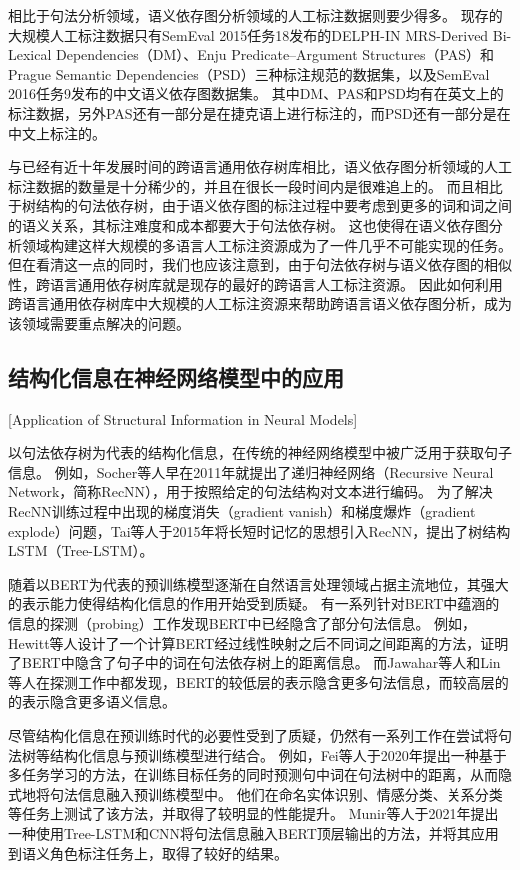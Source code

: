 相比于句法分析领域，语义依存图分析领域的人工标注数据则要少得多。
现存的大规模人工标注数据只有SemEval 2015任务18\cite{oepen-etal-2015-semeval}发布的DELPH-IN MRS-Derived Bi-Lexical Dependencies（DM）、Enju Predicate–Argument Structures（PAS）和Prague Semantic Dependencies（PSD）三种标注规范的数据集，以及SemEval 2016任务9\cite{che-etal-2016-semeval}发布的中文语义依存图数据集。
其中DM、PAS和PSD均有在英文上的标注数据，另外PAS还有一部分是在捷克语上进行标注的，而PSD还有一部分是在中文上标注的。

与已经有近十年发展时间的跨语言通用依存树库相比，语义依存图分析领域的人工标注数据的数量是十分稀少的，并且在很长一段时间内是很难追上的。
而且相比于树结构的句法依存树，由于语义依存图的标注过程中要考虑到更多的词和词之间的语义关系，其标注难度和成本都要大于句法依存树。
这也使得在语义依存图分析领域构建这样大规模的多语言人工标注资源成为了一件几乎不可能实现的任务。
但在看清这一点的同时，我们也应该注意到，由于句法依存树与语义依存图的相似性，跨语言通用依存树库就是现存的最好的跨语言人工标注资源。
因此如何利用跨语言通用依存树库中大规模的人工标注资源来帮助跨语言语义依存图分析，成为该领域需要重点解决的问题。

\subsection{结构化信息在神经网络模型中的应用}[Application of Structural Information in Neural Models]

以句法依存树为代表的结构化信息，在传统的神经网络模型中被广泛用于获取句子信息。
例如，Socher等人早在2011年就提出了递归神经网络（Recursive Neural Network，简称RecNN）\cite{socher-etal-2011-parsing}，用于按照给定的句法结构对文本进行编码。
为了解决RecNN训练过程中出现的梯度消失（gradient vanish）和梯度爆炸（gradient explode）问题\cite{bengio-etal-1994-learning}，Tai等人于2015年将长短时记忆的思想引入RecNN，提出了树结构LSTM（Tree-LSTM）\cite{tai-etal-2015-improved}。

随着以BERT为代表的预训练模型逐渐在自然语言处理领域占据主流地位，其强大的表示能力使得结构化信息的作用开始受到质疑。
有一系列针对BERT中蕴涵的信息的探测（probing）工作发现BERT中已经隐含了部分句法信息。
例如，Hewitt等人\cite{hewitt-manning-2019-structural}设计了一个计算BERT经过线性映射之后不同词之间距离的方法，证明了BERT中隐含了句子中的词在句法依存树上的距离信息。
而Jawahar等人\cite{jawahar-etal-2019-bert}和Lin等人\cite{lin-etal-2019-open}在探测工作中都发现，BERT的较低层的表示隐含更多句法信息，而较高层的的表示隐含更多语义信息。

尽管结构化信息在预训练时代的必要性受到了质疑，仍然有一系列工作在尝试将句法树等结构化信息与预训练模型进行结合。
例如，Fei等人\cite{fei-etal-2020-retrofitting}于2020年提出一种基于多任务学习的方法，在训练目标任务的同时预测句中词在句法树中的距离，从而隐式地将句法信息融入预训练模型中。
他们在命名实体识别、情感分类、关系分类等任务上测试了该方法，并取得了较明显的性能提升。
Munir等人\cite{munir-etal-2021-adaptive}于2021年提出一种使用Tree-LSTM和CNN将句法信息融入BERT顶层输出的方法，并将其应用到语义角色标注任务上，取得了较好的结果。


